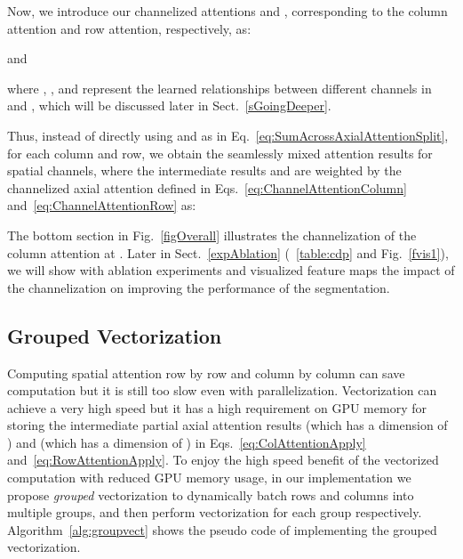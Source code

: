 \documentclass[journal]{IEEEtran}
\begin{document}
Now, we introduce our channelized attentions  and , corresponding to the column attention and row attention, respectively, as: 

and

where , ,  and  represent the learned relationships between different channels in  and , which will be discussed later in Sect.~\ref{sGoingDeeper}.

Thus, instead of directly using  and  as in Eq.~\eqref{eq:SumAcrossAxialAttentionSplit}, 
for each column and row, we obtain the seamlessly mixed attention results for spatial channels, 
where the intermediate results    and  are weighted by the channelized axial attention defined in  Eqs.~\eqref{eq:ChannelAttentionColumn} and~\eqref{eq:ChannelAttentionRow} as: 


The bottom section in Fig.~\ref{figOverall} illustrates the channelization of the column attention at . 
Later in Sect.~\ref{expAblation} (\tablename{~\ref{table:cdp}} and Fig.~\ref{fvis1}), we will show with ablation experiments and visualized feature maps the impact of the channelization on improving the performance of the segmentation. 






\subsection{Grouped Vectorization}
\label {sec:secGroupVect}

Computing spatial attention row by row and column by column can save computation but it is still too slow even with parallelization. 
Vectorization can achieve a very high speed but it has a high requirement on GPU memory for storing the intermediate partial axial attention results  (which has a dimension of ) and  (which has a dimension of ) in Eqs.~\eqref{eq:ColAttentionApply} and~\eqref{eq:RowAttentionApply}. 
To enjoy the high speed benefit of the vectorized computation with reduced GPU memory usage, in our implementation we propose \textit{grouped} vectorization to dynamically batch rows and columns into multiple groups, and then perform vectorization for each group respectively. 
Algorithm~\ref{alg:groupvect} shows the pseudo code of implementing the grouped vectorization. 
\end{document}
